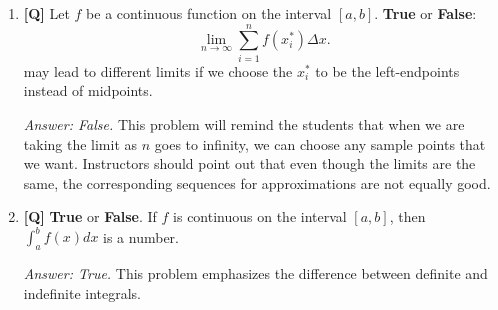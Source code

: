 \documentclass[12pt]{article}
\begin{document}
\begin{enumerate}
{\it Answer: (c).} This is a quick application of the area approximations in this 
section. Once students understand the set up of the problem, the right answer should follow 
immediately from the text reading.

\bigskip

\subsubsection{Class Activities} 

The following activities are designed to
get the students to practice with the idea of estimating, as well
as setting up a Riemann Sum, starting with tangible examples.

\begin{enumerate}
\item A boneless baked turkey breast that is ten inches long from one
end to the other is sliced up in to very thin slices. Each slice
has a cross-sectional area of $(-x^2 +10x)$ square inches for each
$x$ between $0$ and $10$.  What is the volume of the turkey
breast?

\bigskip

\item Suppose you slice the carrot the long way?  What shape slices
would you expect (approximately)?  How could you set up an
expression for the volume of the whole carrot?

\end{enumerate}
\bigskip

\item {\bf [Q]} Let $f$ be a continuous function on the interval $[a,b]$.
{\bf True} or \textbf{False}: \[ \lim_{n \rightarrow \infty}
\sum_{i=1}^n f(x_i^*) \Delta x.\] may lead to different limits if
we choose the $x_i^*$ to be the left-endpoints instead of
midpoints.

{\it Answer: False.} This problem will remind the students that
when we are taking the limit as $n$ goes to infinity, we can
choose any sample points that we want. 
Instructors should point out that even though the limits are the same, the corresponding sequences for approximations are not equally good.

\bigskip

\item {\bf [Q]}
\textbf{True} or \textbf{False}. If $f$ is continuous on the interval
$[a,b]$, then $\int_a^b f(x)dx$  is a number.

{\it Answer: True.} This problem emphasizes the difference
between definite and indefinite integrals. 


\end{enumerate}
\end{document}
